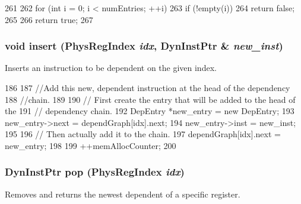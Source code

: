 \begin{DoxyCode}
261 {
262     for (int i = 0; i < numEntries; ++i) {
263         if (!empty(i))
264             return false;
265     }
266     return true;
267 }
\end{DoxyCode}
\hypertarget{classDependencyGraph_a8147b910a65e5096dbbb3b8359f375f8}{
\subsubsection[{insert}]{\setlength{\rightskip}{0pt plus 5cm}void insert ({\bf PhysRegIndex} {\em idx}, \/  DynInstPtr \& {\em new\_\-inst})}}
\label{classDependencyGraph_a8147b910a65e5096dbbb3b8359f375f8}
Inserts an instruction to be dependent on the given index. 


\begin{DoxyCode}
186 {
187     //Add this new, dependent instruction at the head of the dependency
188     //chain.
189 
190     // First create the entry that will be added to the head of the
191     // dependency chain.
192     DepEntry *new_entry = new DepEntry;
193     new_entry->next = dependGraph[idx].next;
194     new_entry->inst = new_inst;
195 
196     // Then actually add it to the chain.
197     dependGraph[idx].next = new_entry;
198 
199     ++memAllocCounter;
200 }
\end{DoxyCode}
\hypertarget{classDependencyGraph_a37140b50c279f856724fe1eac144bc3a}{
\subsubsection[{pop}]{\setlength{\rightskip}{0pt plus 5cm}DynInstPtr pop ({\bf PhysRegIndex} {\em idx})}}
\label{classDependencyGraph_a37140b50c279f856724fe1eac144bc3a}
Removes and returns the newest dependent of a specific register. 


